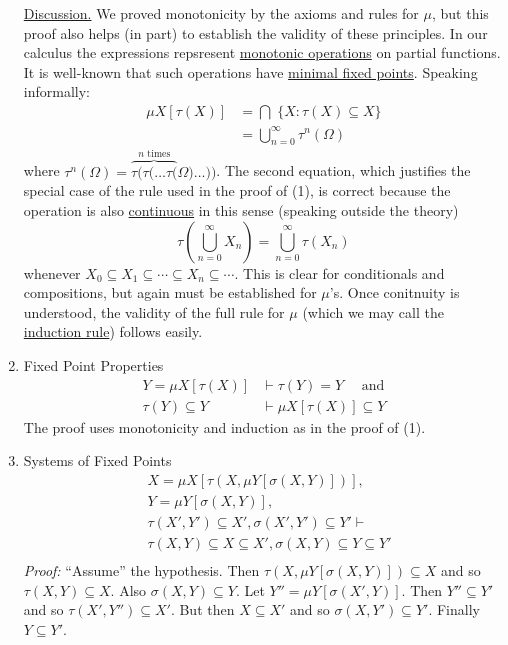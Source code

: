 \documentclass{article}
\begin{document}
\begin{enumerate}
        \underline{Discussion.} We proved monotonicity by the axioms and rules for $\mu$, but this proof also helps (in part) to establish the validity of these principles. In our calculus the expressions repsresent \underline{monotonic operations} on partial functions. It is well-known that such operations have \underline{minimal fixed points}. Speaking informally:
        \begin{align*}
            \mu X[\tau(X)] 
            & = \bigcap \; \{X :  \tau(X) \subseteq X \} \\
            & = \bigcup\limits_{n=0}^\infty \tau^n(\Omega)
        \end{align*}
        where $\tau^n(\Omega) = \overbrace{\tau(\tau(\ldots \tau(}^{n \textrm{ times}} \Omega) \ldots ))$. The second equation, which justifies the special case of the rule used in the proof of (1), is correct because the operation is also \underline{continuous} in this sense (speaking outside the theory)
        \begin{equation*}
            \tau\left( \bigcup\limits_{n=0}^\infty X_n \right) = \bigcup\limits_{n=0}^\infty \tau(X_n)
        \end{equation*}
        whenever $X_0 \subseteq X_1 \subseteq \cdots \subseteq X_n \subseteq \cdots$. This is clear for conditionals and compositions, but again must be established for $\mu$'s. Once conitnuity is understood, the validity of the full rule for $\mu$ (which we may call the \underline{induction rule}) follows easily. \\

    \item Fixed Point Properties
        \begin{align*}
            Y = \mu X [\tau(X) ] & \vdash \tau(Y) = Y \quad \textrm{ and} \\
            \tau(Y) \subseteq Y & \vdash \mu X [ \tau(X) ] \subseteq Y
        \end{align*}
        The proof uses monotonicity and induction as in the proof of (1).  \\

    \item Systems of Fixed Points
        \begin{align*}
            & X = \mu X [ \tau(X, \mu Y[\sigma(X,Y)])], \\
            & Y = \mu Y [ \sigma(X, Y)], \\
            & \tau(X', Y') \subseteq X', \sigma(X', Y') \subseteq Y' \vdash \\
            & \tau(X, Y) \subseteq X \subseteq X', \sigma(X,Y) \subseteq Y \subseteq Y' \\
        \end{align*}
        \textit{Proof:} ``Assume'' the hypothesis. Then $\tau(X, \mu Y[\sigma(X,Y)]) \subseteq X$ and so $\tau(X,Y) \subseteq X$. Also $\sigma(X,Y) \subseteq Y$. Let $Y'' = \mu Y[\sigma(X', Y)]$. Then $Y'' \subseteq Y'$ and so $\tau(X', Y'') \subseteq X'$. But then $X \subseteq X'$ and so $\sigma(X, Y') \subseteq Y'$. Finally $Y \subseteq Y'$. \\


\end{enumerate}
\end{document}
